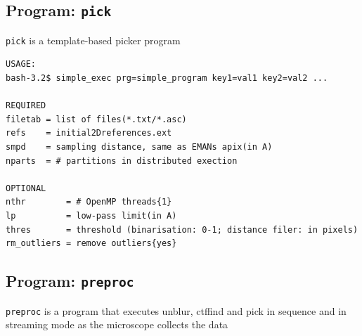 \documentclass[a4paper,11pt]{article}
\newcommand{\prgname}[1]{\textcolor{NavyBlue}{\texttt{#1}}}
\begin{document}
\subsection{Program: \prgname{pick}}
\label{pick}
\prgname{pick} is a template-based picker program

\begin{verbatim}
USAGE:
bash-3.2$ simple_exec prg=simple_program key1=val1 key2=val2 ...

REQUIRED
filetab = list of files(*.txt/*.asc)
refs    = initial2Dreferences.ext
smpd    = sampling distance, same as EMANs apix(in A)
nparts  = # partitions in distributed exection

OPTIONAL
nthr        = # OpenMP threads{1}
lp          = low-pass limit(in A)
thres       = threshold (binarisation: 0-1; distance filer: in pixels)
rm_outliers = remove outliers{yes}
\end{verbatim}

\subsection{Program: \prgname{preproc}}
\label{preproc}
\prgname{preproc} is a program that executes unblur, ctffind and pick in sequence and in streaming mode as the microscope collects the data 
\end{document}
